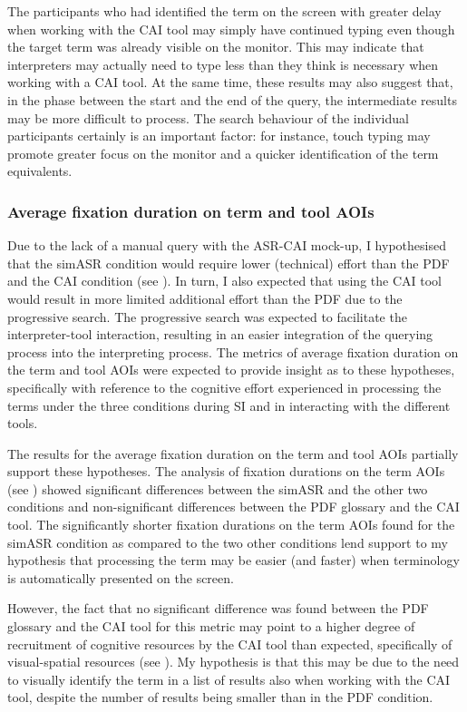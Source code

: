 The participants who had identified the term on the screen with greater delay when working with the CAI tool may simply have continued typing even though the target term was already visible on the monitor. This may indicate that interpreters may actually need to type less than they think is necessary when working with a CAI tool. At the same time, these results may also suggest that, in the phase between the start and the end of the query, the intermediate results may be more difficult to process. The search behaviour of the individual participants certainly is an important factor: for instance, touch typing may promote greater focus on the monitor and a quicker identification of the term equivalents.

\subsubsection{Average fixation duration on term and tool AOIs} \label{fixdurdisc}
Due to the lack of a manual query with the ASR-CAI mock-up, I hypothesised that the simASR condition would require lower (technical) effort than the PDF and the CAI condition (see ). In turn, I also expected that using the CAI tool would result in more limited additional effort than the PDF due to the progressive search. The progressive search was expected to facilitate the interpreter-tool interaction, resulting in an easier integration of the querying process into the interpreting process. The metrics of average fixation duration on the term and tool AOIs were expected to provide insight as to these hypotheses, specifically with reference to the cognitive effort experienced in processing the terms under the three conditions during SI and in interacting with the different tools.

The results for the average fixation duration on the term and tool AOIs partially support these hypotheses. The analysis of fixation durations on the term AOIs (see ) showed significant differences between the simASR and the other two conditions and non-significant differences between the PDF glossary and the CAI tool. The significantly shorter fixation durations on the term AOIs found for the simASR condition as compared to the two other conditions lend support to my hypothesis that processing the term may be easier (and faster) when terminology is automatically presented on the screen.

However, the fact that no significant difference was found between the PDF glossary and the CAI tool for this metric may point to a higher degree of recruitment of cognitive resources by the CAI tool than expected, specifically of visual-spatial resources (see ). My hypothesis is that this may be due to the need to visually identify the term in a list of results also when working with the CAI tool, despite the number of results being smaller than in the PDF condition.

